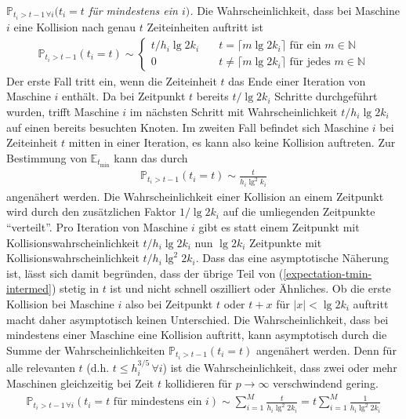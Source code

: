 \documentclass[a4paper, 11pt, ngerman]{article}
\newcommand{\E}{\mathbb{E}}
\newcommand{\N}{\mathbb{N}}
\renewcommand{\P}{\mathbb{P}}
\begin{document}
\emph{$\P_{t_i > t - 1 \, \forall i}(t_i = t$  für mindestens ein $i)$.} Die Wahrscheinlichkeit, dass bei Maschine $i$ eine Kollision nach genau $t$ Zeiteinheiten auftritt ist
\begin{align*}
    \P_{t_i > t - 1}(t_i = t) \sim
    \begin{cases}
        t / h_i \lg 2k_i & \quad
        t = \lceil m \lg 2k_i \rceil \text{ für ein } m \in \N \\
        0                & \quad
        t \ne \lceil m \lg 2k_i \rceil \text{ für jedes } m \in \N
    \end{cases}
\end{align*}
Der erste Fall tritt ein, wenn die Zeiteinheit $t$ das Ende einer Iteration von Maschine $i$ enthält. Da bei Zeitpunkt $t$ bereits $t/\lg 2k_i$ Schritte durchgeführt wurden, trifft Maschine $i$ im nächsten Schritt mit Wahrscheinlichkeit $t/h_i \lg 2k_i$ auf einen bereits besuchten Knoten. Im zweiten Fall befindet sich Maschine $i$ bei Zeiteinheit $t$ mitten in einer Iteration, es kann also keine Kollision auftreten. Zur Bestimmung von $\E_{t_{\min}}$ kann das durch
\begin{align*}
    \P_{t_i > t - 1}(t_i = t) \sim \frac {t} {h_i \lg^2 k_i}
\end{align*}
angenähert werden. Die Wahrscheinlichkeit einer Kollision an einem Zeitpunkt wird durch den zusätzlichen Faktor $1/\lg 2k_i$ auf die umliegenden Zeitpunkte "`verteilt"'. Pro Iteration von Maschine $i$ gibt es statt einem Zeitpunkt mit Kollisionswahrscheinlichkeit $t/h_i \lg 2k_i$ nun $\lg 2k_i$ Zeitpunkte mit Kollisionswahrscheinlichkeit $t/h_i \lg^2 2k_i$. Dass das eine asymptotische Näherung ist, lässt sich damit begründen, dass der übrige Teil von (\ref{expectation-tmin-intermed}) stetig in $t$ ist und nicht schnell oszilliert oder Ähnliches. Ob die erste Kollision bei Maschine $i$ also bei Zeitpunkt $t$ oder $t + x$ für $|x| < \lg 2k_i$ auftritt macht daher asymptotisch keinen Unterschied. Die Wahrscheinlichkeit, dass bei mindestens einer Maschine eine Kollision auftritt, kann asymptotisch durch die Summe der Wahrscheinlichkeiten $\P_{t_i > t - 1}(t_i = t)$ angenähert werden. Denn für alle relevanten $t$ (d.h. $t \le h_i^{3/5} \, \forall i$) ist die Wahrscheinlichkeit, dass zwei oder mehr Maschinen gleichzeitig bei Zeit $t$ kollidieren für $p \to \infty$ verschwindend gering.
\begin{align}
    \P_{t_i > t - 1 \, \forall i}(t_i = t \text{ für mindestens ein } i)
    \sim \sum_{i = 1}^M \frac t {h_i \lg^2 2k_i}
    = t \sum_{i = 1}^M \frac 1 {h_i \lg^2 2k_i}
    \label{prob-at-least-one-coll}
\end{align}
\end{document}

